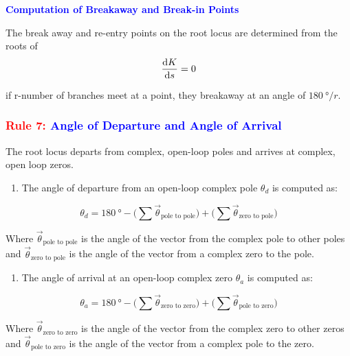 \documentclass[
  14pt,
  a4paper,
  oneside,
  open=any,
  a4paper,
  14pt]{report}
\providecommand{\tightlist}{%
  \setlength{\itemsep}{0pt}\setlength{\parskip}{0pt}}\usepackage{longtable,booktabs,array}
\begin{document}
\textcolor{blue}{\textbf{Computation of Breakaway and Break-in Points}}

The break away and re-entry points on the root locus are determined from
the roots of \[
    \odv{K}{s} = 0
\]

if r-number of branches meet at a point, they breakaway at an angle of
\(\qty{180}{\degree}/r\).

\subsubsection*{\texorpdfstring{\textcolor{red}{Rule 7:}
\textcolor{blue}{Angle of Departure and Angle of
Arrival}}{Rule 7: Angle of Departure and Angle of Arrival}}\label{rule-7-angle-of-departure-and-angle-of-arrival}

The root locus departs from complex, open-loop poles and arrives at
complex, open loop zeros.

\begin{enumerate}
\def\labelenumi{\roman{enumi}.}
\tightlist
\item
  The angle of departure from an open-loop complex pole \(\theta_d\) is
  computed as:
\end{enumerate}

\[
    \theta_d = \qty{180}{\degree} - \bigg(\sum \vec{\theta}_{\text{pole to pole}}\bigg) + \bigg(\sum \vec{\theta}_{\text{zero to pole}}\bigg)
\]

Where \(\vec{\theta}_{\text{pole to pole}}\) is the angle of the vector
from the complex pole to other poles and
\(\vec{\theta}_{\text{zero to pole}}\) is the angle of the vector from a
complex zero to the pole.

\begin{enumerate}
\def\labelenumi{\roman{enumi}.}
\setcounter{enumi}{1}
\tightlist
\item
  The angle of arrival at an open-loop complex zero \(\theta_a\) is
  computed as:
\end{enumerate}

\[
    \theta_a = \qty{180}{\degree} - \bigg(\sum \vec{\theta}_{\text{zero to zero}}\bigg) + \bigg(\sum \vec{\theta}_{\text{pole to zero}} \bigg)
\]

Where \(\vec{\theta}_{\text{zero to zero}}\) is the angle of the vector
from the complex zero to other zeros and
\(\vec{\theta}_{\text{pole to zero}}\) is the angle of the vector from a
complex pole to the zero.
\end{document}
